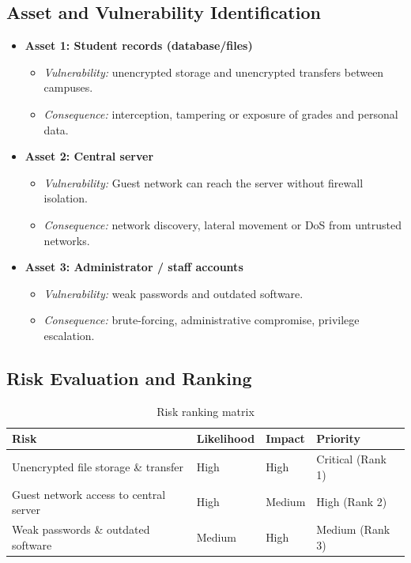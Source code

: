 \documentclass[11pt,a4paper]{article}
\begin{document}
\subsection{Asset and Vulnerability Identification}
\begin{itemize}
  \item \textbf{Asset 1: Student records (database/files)}
  \begin{itemize}
    \item \textit{Vulnerability:} unencrypted storage and unencrypted transfers between campuses.
    \item \textit{Consequence:} interception, tampering or exposure of grades and personal data.
  \end{itemize}
  \item \textbf{Asset 2: Central server}
  \begin{itemize}
    \item \textit{Vulnerability:} Guest network can reach the server without firewall isolation.
    \item \textit{Consequence:} network discovery, lateral movement or DoS from untrusted networks.
  \end{itemize}
  \item \textbf{Asset 3: Administrator / staff accounts}
  \begin{itemize}
    \item \textit{Vulnerability:} weak passwords and outdated software.
    \item \textit{Consequence:} brute-forcing, administrative compromise, privilege escalation.
  \end{itemize}
\end{itemize}

\subsection{Risk Evaluation and Ranking}
\begin{table}[h!]
  \centering
  \begin{tabular}{@{}llll@{}}
    \toprule
    \textbf{Risk} & \textbf{Likelihood} & \textbf{Impact} & \textbf{Priority} \\
    \midrule
    Unencrypted file storage \& transfer      & High   & High   & Critical (Rank 1) \\
    Guest network access to central server    & High   & Medium & High (Rank 2) \\
    Weak passwords \& outdated software       & Medium & High   & Medium (Rank 3) \\
    \bottomrule
  \end{tabular}
  \caption{Risk ranking matrix}
\end{table}
\end{document}
